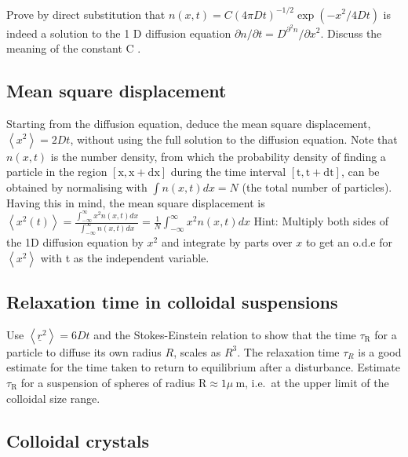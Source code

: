\documentclass[
  letterpaper,
  enabledeprecatedfontcommands]{report}
\begin{document}
Prove by direct substitution that
\(n(x, t)=C(4 \pi D t)^{-1 / 2} \exp \left(-x^{2} / 4 D t\right)\) is
indeed a solution to the 1 D diffusion equation
\(\partial n / \partial t=D^{\partial^{2} n} / \partial x^{2}\). Discuss
the meaning of the constant C .

\subsection{Mean square displacement}\label{mean-square-displacement-1}

Starting from the diffusion equation, deduce the mean square
displacement, \(\left\langle x^{2}\right\rangle=2 D t\), without using
the full solution to the diffusion equation. Note that \(n(x, t)\) is
the number density, from which the probability density of finding a
particle in the region \([\mathrm{x}, \mathrm{x}+\mathrm{dx}]\) during
the time interval \([\mathrm{t}, \mathrm{t}+\mathrm{dt}]\), can be
obtained by normalising with \(\int n(x, t) d x=N\) (the total number of
particles). Having this in mind, the mean square displacement is
\(\left\langle x^{2}(t)\right\rangle=\frac{\int_{-\infty}^{\infty} x^{2} n(x, t) d x}{\int_{-\infty}^{\infty} n(x, t) d x}=\frac{1}{N} \int_{-\infty}^{\infty} x^{2} n(x, t) d x\)
Hint: Multiply both sides of the 1D diffusion equation by \(x^{2}\) and
integrate by parts over \(x\) to get an o.d.e for
\(\left\langle x^{2}\right\rangle\) with t as the independent variable.

\subsection{Relaxation time in colloidal
suspensions}\label{relaxation-time-in-colloidal-suspensions}

Use \(\left\langle\underline{r}^{2}\right\rangle=6 D t\) and the
Stokes-Einstein relation to show that the time \(\tau_{\mathrm{R}}\) for
a particle to diffuse its own radius \(R\), scales as \(R^{3}\). The
relaxation time \(\tau_{R}\) is a good estimate for the time taken to
return to equilibrium after a disturbance. Estimate
\(\tau_{\mathrm{R}}\) for a suspension of spheres of radius
\(\mathrm{R} \approx 1 \mu \mathrm{~m}\), i.e.~at the upper limit of the
colloidal size range.

\subsection{Colloidal crystals}\label{colloidal-crystals}
\end{document}
